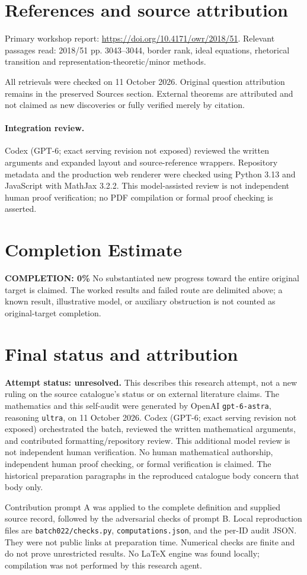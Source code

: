 \documentclass[11pt]{article}
\begin{document}
\section{References and source attribution}
Primary workshop report: \url{https://doi.org/10.4171/owr/2018/51}. Relevant passages read: 2018/51 pp. 3043--3044, border rank, ideal equations, rhetorical transition and representation-theoretic/minor methods.

All retrievals were checked on 11 October 2026. Original question attribution remains in the preserved Sources section. External theorems are attributed and not claimed as new discoveries or fully verified merely by citation.


\paragraph{Integration review.} Codex (GPT-6; exact serving revision not exposed) reviewed the written arguments and expanded layout and source-reference wrappers. Repository metadata and the production web renderer were checked using Python 3.13 and JavaScript with MathJax 3.2.2. This model-assisted review is not independent human proof verification; no PDF compilation or formal proof checking is asserted.

\section{Completion Estimate}
\noindent\textbf{COMPLETION: 0\%}
No substantiated new progress toward the entire original target is claimed. The worked results and failed route are delimited above; a known result, illustrative model, or auxiliary obstruction is not counted as original-target completion.

\section{Final status and attribution}
\textbf{Attempt status: unresolved.} This describes this research attempt, not a new ruling on the source catalogue's status or on external literature claims.
The mathematics and this self-audit were generated by OpenAI \texttt{gpt-6-astra}, reasoning \texttt{ultra}, on 11 October 2026. Codex (GPT-6; exact serving revision not exposed) orchestrated the batch, reviewed the written mathematical arguments, and contributed formatting/repository review. This additional model review is not independent human verification. No human mathematical authorship, independent human proof checking, or formal verification is claimed. The historical preparation paragraphs in the reproduced catalogue body concern that body only.

Contribution prompt A was applied to the complete definition and supplied source record, followed by the adversarial checks of prompt B. Local reproduction files are \texttt{batch022/checks.py}, \texttt{computations.json}, and the per-ID audit JSON. They were not public links at preparation time. Numerical checks are finite and do not prove unrestricted results. No LaTeX engine was found locally; compilation was not performed by this research agent.
\end{document}
